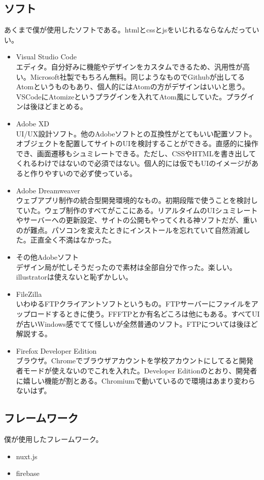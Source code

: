 \documentclass[dvipdfmx,jb5]{jarticle}
\begin{document}
 \subsection{ソフト}
 あくまで僕が使用したソフトである。htmlとcssとjsをいじれるならなんだっていい。
  \begin{itemize}
  \item Visual Studio Code\\
  エディタ。自分好みに機能やデザインをカスタムできるため、汎用性が高い。Microsoft社製でもちろん無料。同じようなものでGithubが出してるAtomというものもあり、個人的にはAtomの方がデザインはいいと思う。VSCodeにAtomizeというプラグインを入れてAtom風にしていた。プラグインは後ほどまとめる。
  \item Adobe XD\\
  UI/UX設計ソフト。他のAdobeソフトとの互換性がとてもいい配置ソフト。オブジェクトを配置してサイトのUIを検討することができる。直感的に操作でき、画面遷移もシュミレートできる。ただし、CSSやHTMLを書き出してくれるわけではないので必須ではない。個人的には仮でもUIのイメージがあると作りやすいので必ず使っている。
  \item Adobe Dreamweaver\\
  ウェブアプリ制作の統合型開発環境的なもの。初期段階で使うことを検討していた。ウェブ制作のすべてがここにある。リアルタイムのUIシュミレートやサーバーへの更新設定、サイトの公開もやってくれる神ソフトだが、重いのが難点。パソコンを変えたときにインストールを忘れていて自然消滅した。正直全く不満はなかった。
  \item その他Adobeソフト\\
  デザイン局が忙しそうだったので素材は全部自分で作った。楽しい。illustratorは使えないと恥ずかしい。
  \item FileZilla\\
  いわゆるFTPクライアントソフトというもの。FTPサーバーにファイルをアップロードするときに使う。FFFTPとか有名どころは他にもある。すべてUIが古いWindows感でてて怪しいが全然普通のソフト。FTPについては後ほど解説する。
  \item Firefox Developer Edition\\
  ブラウザ。Chromeでブラウザアカウントを学校アカウントにしてると開発者モードが使えないのでこれを入れた。Developer Editionのとおり、開発者に嬉しい機能が割とある。Chromiumで動いているので環境はあまり変わらないはず。
 \end{itemize}
 \subsection{フレームワーク}
 僕が使用したフレームワーク。
  \begin{itemize}
 \item nuxt.js\\
 
 \item firebase\\
 \end{itemize}
\end{document}
